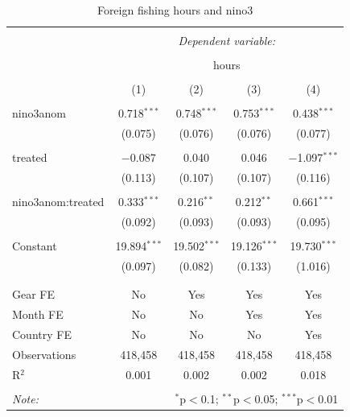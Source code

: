 \documentclass[]{article}
\begin{document}
\begin{table}[!htbp] \centering 
  \caption{\label{tab:kir_vessels}Foreign fishing hours and nino3} 
  \label{} 
\begin{tabular}{@{\extracolsep{5pt}}lcccc} 
\\[-1.8ex]\hline 
\hline \\[-1.8ex] 
 & \multicolumn{4}{c}{\textit{Dependent variable:}} \\ 
\cline{2-5} 
\\[-1.8ex] & \multicolumn{4}{c}{hours} \\ 
\\[-1.8ex] & (1) & (2) & (3) & (4)\\ 
\hline \\[-1.8ex] 
 nino3anom & 0.718$^{***}$ & 0.748$^{***}$ & 0.753$^{***}$ & 0.438$^{***}$ \\ 
  & (0.075) & (0.076) & (0.076) & (0.077) \\ 
  & & & & \\ 
 treated & $-$0.087 & 0.040 & 0.046 & $-$1.097$^{***}$ \\ 
  & (0.113) & (0.107) & (0.107) & (0.116) \\ 
  & & & & \\ 
 nino3anom:treated & 0.333$^{***}$ & 0.216$^{**}$ & 0.212$^{**}$ & 0.661$^{***}$ \\ 
  & (0.092) & (0.093) & (0.093) & (0.095) \\ 
  & & & & \\ 
 Constant & 19.894$^{***}$ & 19.502$^{***}$ & 19.126$^{***}$ & 19.730$^{***}$ \\ 
  & (0.097) & (0.082) & (0.133) & (1.016) \\ 
  & & & & \\ 
\hline \\[-1.8ex] 
Gear FE & No & Yes & Yes & Yes \\ 
Month FE & No & No & Yes & Yes \\ 
Country FE & No & No & No & Yes \\ 
Observations & 418,458 & 418,458 & 418,458 & 418,458 \\ 
R$^{2}$ & 0.001 & 0.002 & 0.002 & 0.018 \\ 
\hline 
\hline \\[-1.8ex] 
\textit{Note:}  & \multicolumn{4}{r}{$^{*}$p$<$0.1; $^{**}$p$<$0.05; $^{***}$p$<$0.01} \\ 
\end{tabular} 
\end{table}
\end{document}
